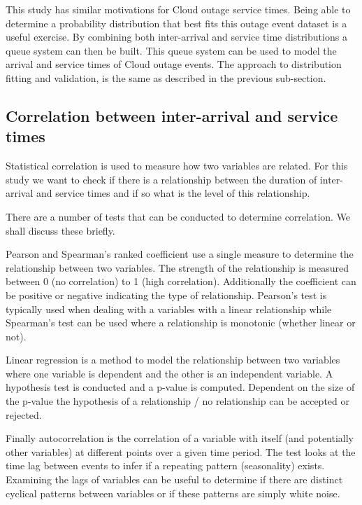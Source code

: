 \documentclass[5p]{elsarticle}
\begin{document}
This study has similar motivations for Cloud outage service times. Being able to determine a probability distribution that best fits this outage event dataset is a useful exercise. By combining both inter-arrival and service time distributions a queue system can then be built. This queue system can be used to model the arrival and service times of Cloud outage events. The approach to distribution fitting and validation, is the same as described in the previous sub-section. 

\subsection{Correlation between inter-arrival and service times}

Statistical correlation is used to measure how two variables are related. For this study we want to check if there is a relationship between the duration of inter-arrival and service times and if so what is the level of this relationship. 

There are a number of tests that can be conducted to determine correlation. We shall discuss these briefly.

Pearson \cite{fisher1915frequency} and Spearman's \cite{spearman1904proof} ranked coefficient use a single measure to determine the relationship between two variables. The strength of the relationship is measured between 0 (no correlation) to 1 (high correlation). Additionally the coefficient can be positive or negative indicating the type of relationship. Pearson's test is typically used when dealing with a variables with a linear relationship while Spearman's test can be used where a relationship is monotonic (whether linear or not). 

Linear regression \cite{galton1890kinship} is a method to model the relationship between two variables where one variable is dependent and the other is an  independent variable. A hypothesis test is conducted and a p-value is computed. Dependent on the size of the p-value the hypothesis of a relationship / no relationship can be accepted or rejected.

Finally autocorrelation \cite{box1970distribution} is the correlation of a variable with itself (and potentially other variables) at different points over a given time period. The test looks at the time lag between events to infer if a repeating pattern (seasonality) exists. Examining the lags of variables can be useful to determine if there are distinct cyclical patterns between variables or if these patterns are simply white noise.
\end{document}
